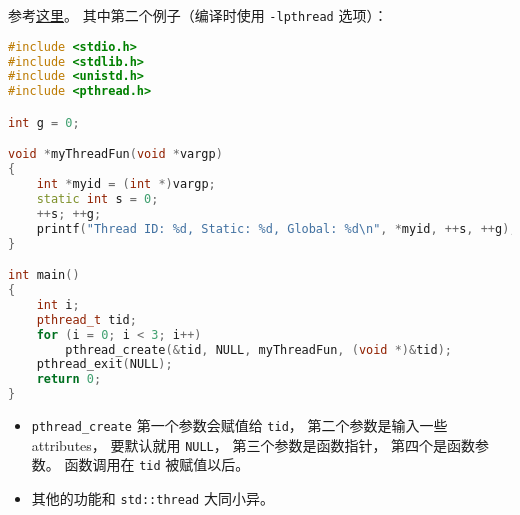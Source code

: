 
\begin{issues}
\issueDraft
\end{issues}

参考\href{https://www.geeksforgeeks.org/multithreading-c-2/}{这里}。 其中第二个例子（编译时使用 \verb|-lpthread| 选项）：
\begin{lstlisting}[language=cpp]
#include <stdio.h>
#include <stdlib.h>
#include <unistd.h>
#include <pthread.h>

int g = 0;

void *myThreadFun(void *vargp)
{
	int *myid = (int *)vargp;
	static int s = 0;
	++s; ++g;
	printf("Thread ID: %d, Static: %d, Global: %d\n", *myid, ++s, ++g);
}

int main()
{
	int i;
	pthread_t tid;
	for (i = 0; i < 3; i++)
		pthread_create(&tid, NULL, myThreadFun, (void *)&tid);
	pthread_exit(NULL);
	return 0;
}
\end{lstlisting}

\begin{itemize}
\item \verb|pthread_create| 第一个参数会赋值给 \verb|tid|， 第二个参数是输入一些 attributes， 要默认就用 \verb|NULL|， 第三个参数是函数指针， 第四个是函数参数。 函数调用在 \verb|tid| 被赋值以后。
\item 其他的功能和 \verb|std::thread| 大同小异。
\end{itemize}


